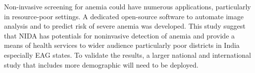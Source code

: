 \documentclass[peerreview]{IEEEtran}
\begin{document}
Non-invasive screening for anemia could have numerous applications, particularly in resource-poor settings. A 
dedicated open-source software to automate image analysis and to predict risk of severe anemia was developed. 
This study suggest that NIDA has potentials for noninvasive detection of anemia and provide a means of health 
services to wider audience particularly poor districts in India especially EAG states. To validate 
the results, a larger national and international study that includes more demographic will need to be deployed.
% 
%  
% 





\end{document}
